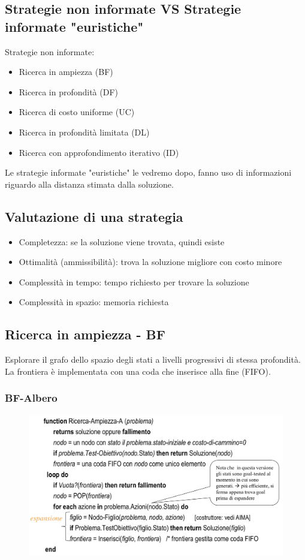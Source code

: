 \documentclass{article}
\begin{document}
\subsection{Strategie non informate VS Strategie informate "euristiche"}
Strategie non informate:
\begin{itemize}
    \item Ricerca in ampiezza (BF)
    \item Ricerca in profondità (DF)
    \item Ricerca di costo uniforme (UC)
    \item Ricerca in profondità limitata (DL)
    \item Ricerca con approfondimento iterativo (ID)
\end{itemize}
Le strategie informate "euristiche" le vedremo dopo, fanno uso di informazioni riguardo alla distanza stimata dalla soluzione.

\subsection{Valutazione di una strategia}
\begin{itemize}
    \item Completezza: se la soluzione viene trovata, quindi esiste
    \item Ottimalità (ammissibilità): trova la soluzione migliore con costo minore
    \item Complessità in tempo: tempo richiesto per trovare la soluzione
    \item Complessità in spazio: memoria richiesta
\end{itemize}

\subsection{Ricerca in ampiezza - BF}
Esplorare il grafo dello spazio degli stati a livelli progressivi di stessa profondità. La frontiera è implementata con una coda che inserisce alla fine (FIFO).
\subsubsection{BF-Albero}
\begin{figure}[H]
    \centering
    \includegraphics[scale=0.5]{Images/BFA.png}
\end{figure}
\end{document}
